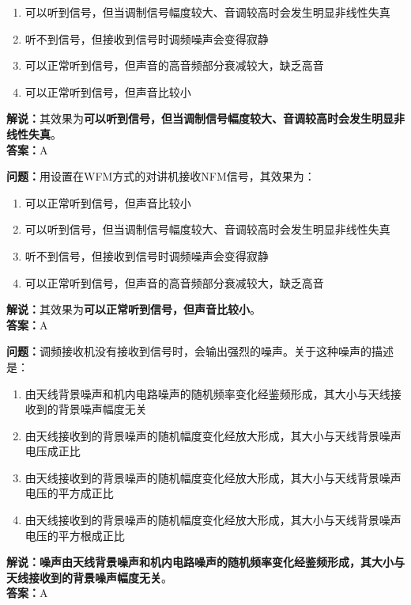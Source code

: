 \begin{enumerate}[label=\Alph*), leftmargin=1cm]
	\item 可以听到信号，但当调制信号幅度较大、音调较高时会发生明显非线性失真
	\item 听不到信号，但接收到信号时调频噪声会变得寂静
	\item 可以正常听到信号，但声音的高音频部分衰减较大，缺乏高音
	\item 可以正常听到信号，但声音比较小
\end{enumerate}

\textbf{解说：}其效果为\textbf{可以听到信号，但当调制信号幅度较大、音调较高时会发生明显非线性失真}。\\\textbf{答案：}A%

\textbf{问题：}用设置在WFM方式的对讲机接收NFM信号，其效果为：

\begin{enumerate}[label=\Alph*), leftmargin=1cm]
	\item 可以正常听到信号，但声音比较小
	\item 可以听到信号，但当调制信号幅度较大、音调较高时会发生明显非线性失真
	\item 听不到信号，但接收到信号时调频噪声会变得寂静
	\item 可以正常听到信号，但声音的高音频部分衰减较大，缺乏高音
\end{enumerate}

\textbf{解说：}其效果为\textbf{可以正常听到信号，但声音比较小}。\\\textbf{答案：}A%


\textbf{问题：}调频接收机没有接收到信号时，会输出强烈的噪声。关于这种噪声的描述是：

\begin{enumerate}[label=\Alph*), leftmargin=1cm]
	\item 由天线背景噪声和机内电路噪声的随机频率变化经鉴频形成，其大小与天线接收到的背景噪声幅度无关
	\item 由天线接收到的背景噪声的随机幅度变化经放大形成，其大小与天线背景噪声电压成正比
	\item 由天线接收到的背景噪声的随机幅度变化经放大形成，其大小与天线背景噪声电压的平方成正比
	\item 由天线接收到的背景噪声的随机幅度变化经放大形成，其大小与天线背景噪声电压的平方根成正比
\end{enumerate}

\textbf{解说：噪声由天线背景噪声和机内电路噪声的随机频率变化经鉴频形成，其大小与天线接收到的背景噪声幅度无关}。\\\textbf{答案：}A%


